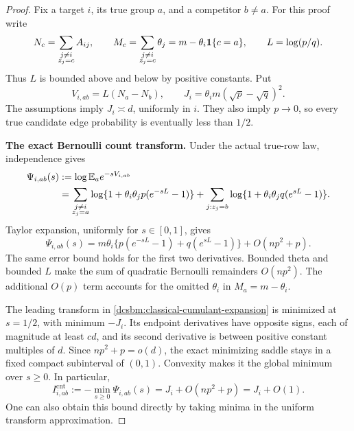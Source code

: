 \begin{proof}
Fix a target \(i\), its true group \(a\), and a competitor \(b\ne a\).
For this proof write
\[
 N_c=\sum_{\substack{j\ne i\\z_j=c}}A_{ij},\qquad
 M_c=\sum_{\substack{j\ne i\\z_j=c}}\theta_j
     =m-\theta_i\mathbf1\{c=a\},\qquad
 L=\log(p/q).
\]
Thus \(L\) is bounded above and below by positive constants.
Put
\[
 V_{i,ab}=L(N_a-N_b),\qquad
 J_i=\theta_i m(\sqrt p-\sqrt q)^2 .
\]
The assumptions imply \(J_i\asymp d\), uniformly in \(i\).
They also imply \(p\to0\), so every true candidate edge probability
is eventually less than \(1/2\).

\medskip
\noindent\textbf{The exact Bernoulli count transform.}
Under the actual true-row law, independence gives
\begin{align}
 \Psi_{i,ab}(s)
 &:=\log\mathbb E_a e^{-sV_{i,ab}}\nonumber\\
 &=\sum_{\substack{j\ne i\\z_j=a}}
   \log\{1+\theta_i\theta_jp(e^{-sL}-1)\}
   +\sum_{j:z_j=b}
   \log\{1+\theta_i\theta_jq(e^{sL}-1)\}.
 \label{dcsbm:classical-cumulant}
\end{align}
Taylor expansion, uniformly for \(s\in[0,1]\), gives
\begin{equation}
 \Psi_{i,ab}(s)
 =m\theta_i\{p(e^{-sL}-1)+q(e^{sL}-1)\}
       +O(np^2+p).
 \label{dcsbm:classical-cumulant-expansion}
\end{equation}
The same error bound holds for the first two derivatives. Bounded theta
and bounded \(L\) make the sum of quadratic Bernoulli remainders
\(O(np^2)\). The additional \(O(p)\) term accounts for the omitted
\(\theta_i\) in \(M_a=m-\theta_i\).

The leading transform in
\eqref{dcsbm:classical-cumulant-expansion} is minimized at \(s=1/2\),
with minimum \(-J_i\). Its endpoint derivatives have opposite signs,
each of magnitude at least \(cd\), and its second derivative is
between positive constant multiples of \(d\).
Since \(np^2+p=o(d)\), the exact minimizing saddle stays in a fixed
compact subinterval of \((0,1)\). Convexity makes it the global
minimum over \(s\ge0\). In particular,
\begin{equation}
 I^{\mathrm{cnt}}_{i,ab}
 :=-\min_{s\ge0}\Psi_{i,ab}(s)
 =J_i+O(np^2+p)=J_i+O(1).
 \label{dcsbm:classical-information}
\end{equation}
One can also obtain this bound directly by taking minima in the
uniform transform approximation.


\end{proof}
